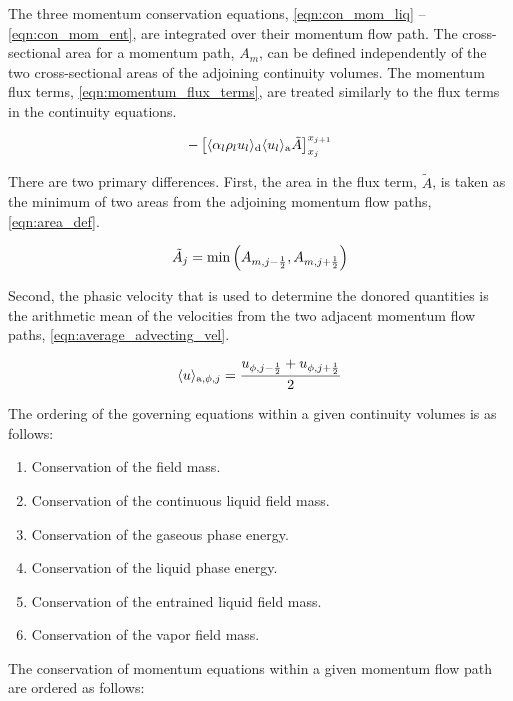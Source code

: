 The three momentum conservation equations, \eqref{eqn:con_mom_liq} -- \eqref{eqn:con_mom_ent}, are integrated over their momentum flow path.
The cross-sectional area for a momentum path, $A_{m}$, can be defined independently of the two cross-sectional areas of the adjoining continuity volumes.
The momentum flux terms, \eqref{eqn:momentum_flux_terms}, are treated similarly to the flux terms in the continuity equations.

\begin{equation}
\label{eqn:momentum_flux_terms}
-\left[\don{\alpha_l \rho_l u_l}_{\text{d}} \ave{u_{l}}_{\text{a}} \tilde{A}\right]_{x_{j }}^{x_{j + 1}}
\end{equation}

There are two primary differences.
First, the area in the flux term, $\tilde{A}$, is taken as the minimum of two areas from the adjoining momentum flow paths, \eqref{eqn:area_def}.

\begin{equation}
\label{eqn:area_def}
\tilde{A}_{j} = \min\left(A_{m,j - \onehalf}, A_{m,j+\onehalf}\right)
\end{equation}

Second, the phasic velocity that is used to determine the donored quantities is the arithmetic mean of the velocities from the two adjacent momentum flow paths, \eqref{eqn:average_advecting_vel}.

\begin{equation}
\label{eqn:average_advecting_vel}
\ave{u}_{\text{a},\phi, j} = \frac{u_{\phi, j - \onehalf} + u_{\phi, j+ \onehalf}}{2}
\end{equation}

The ordering of the governing equations within a given continuity volumes is as follows:

\begin{enumerate}
\item{Conservation of the \ncg{} field mass.}
\item{Conservation of the continuous liquid field mass.}
\item{Conservation of the gaseous phase energy.}
\item{Conservation of the liquid phase energy.}
\item{Conservation of the entrained liquid field mass.}
\item{Conservation of the vapor field mass.}
\end{enumerate}

The conservation of momentum equations within a given momentum flow path are ordered as follows:

